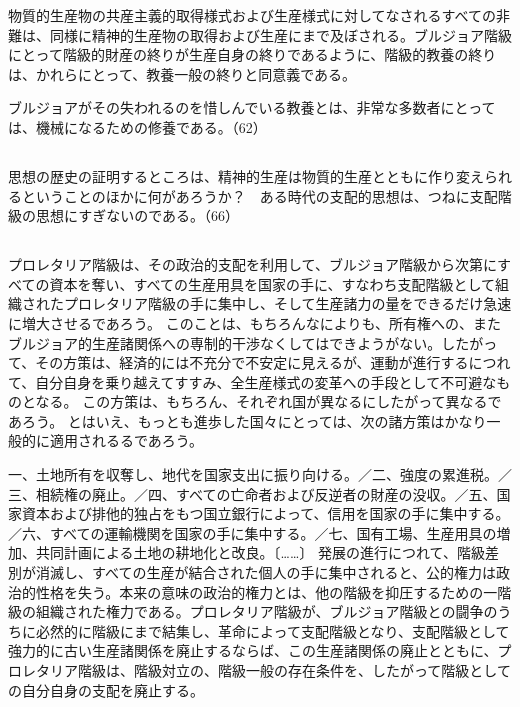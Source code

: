 物質的生産物の共産主義的取得様式および生産様式に対してなされるすべての非難は、同様に精神的生産物の取得および生産にまで及ぼされる。ブルジョア階級にとって階級的財産の終りが生産自身の終りであるように、階級的教養の終りは、かれらにとって、教養一般の終りと同意義である。

ブルジョアがその失われるのを惜しんでいる教養とは、非常な多数者にとっては、機械になるための修養である。（62）

\subsection{}


思想の歴史の証明するところは、精神的生産は物質的生産とともに作り変えられるということのほかに何があろうか？　ある時代の支配的思想は、つねに支配階級の思想にすぎないのである。（66）

\subsection{}


プロレタリア階級は、その政治的支配を利用して、ブルジョア階級から次第にすべての資本を奪い、すべての生産用具を国家の手に、すなわち支配階級として組織されたプロレタリア階級の手に集中し、そして生産諸力の量をできるだけ急速に増大させるであろう。
このことは、もちろんなによりも、所有権への、またブルジョア的生産諸関係への専制的干渉なくしてはできようがない。したがって、その方策は、経済的には不充分で不安定に見えるが、運動が進行するにつれて、自分自身を乗り越えてすすみ、全生産様式の変革への手段として不可避なものとなる。
この方策は、もちろん、それぞれ国が異なるにしたがって異なるであろう。
とはいえ、もっとも進歩した国々にとっては、次の諸方策はかなり一般的に適用されるるであろう。

一、土地所有を収奪し、地代を国家支出に振り向ける。／二、強度の累進税。／三、相続権の廃止。／四、すべての亡命者および反逆者の財産の没収。／五、国家資本および排他的独占をもつ国立銀行によって、信用を国家の手に集中する。／六、すべての運輸機関を国家の手に集中する。／七、国有工場、生産用具の増加、共同計画による土地の耕地化と改良。〔……〕
発展の進行につれて、階級差別が消滅し、すべての生産が結合された個人の手に集中されると、公的権力は政治的性格を失う。本来の意味の政治的権力とは、他の階級を抑圧するための一階級の組織された権力である。プロレタリア階級が、ブルジョア階級との闘争のうちに必然的に階級にまで結集し、革命によって支配階級となり、支配階級として強力的に古い生産諸関係を廃止するならば、この生産諸関係の廃止とともに、プロレタリア階級は、階級対立の、階級一般の存在条件を、したがって階級としての自分自身の支配を廃止する。

